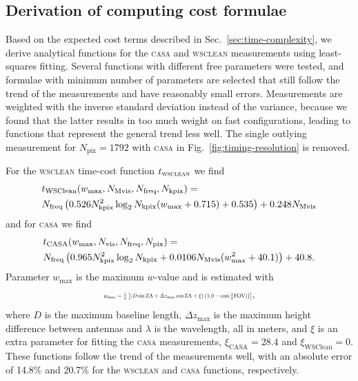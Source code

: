\documentclass[useAMS,usenatbib]{mn2e}
\begin{document}

\subsection{Derivation of computing cost formulae}
Based on the expected cost terms described in Sec.~\ref{sec:time-complexity}, we derive analytical functions for the \textsc{casa} and \textsc{wsclean} measurements using least-squares fitting. Several functions with different free parameters were tested, and formulae with minimum number of parameters are selected that still follow the trend of the measurements and have reasonably small errors. Measurements are weighted with the inverse standard deviation instead of the variance, because we found that the latter results in too much weight on fast configurations, leading to functions that represent the general trend less well. The single outlying measurement for $N_\textrm{pix}=1792$ with \textsc{casa} in Fig.~\ref{fig:timing-resolution} is removed.

For the \textsc{wsclean} time-cost function $t_\textrm{\textsc{wsclean}}$ we find 
\begin{align}\label{eq:wsclean-computing-cost}
& t_\textrm{WSClean} (w_{\max},N_\textrm{Mvis},N_\textrm{freq},N_\textrm{kpix}) = \\ \notag%
& N_\textrm{freq} \left( 0.526 N_\textrm{kpix}^2 \log_2 N_\textrm{kpix} (w_{\max} + 0.715) + 0.535 \right) + 0.248 N_\textrm{Mvis}
\end{align}
and for \textsc{casa} we find
\begin{align}\label{eq:casa-computing-cost}
& t_\textrm{CASA}(w_{\max},N_\textrm{vis},N_\textrm{freq},N_\textrm{pix}) = \\ \notag%
& N_\textrm{freq} \left(0.965 N_\textrm{kpix}^2 \log_2 N_\textrm{kpix} + 0.0106 N_\textrm{Mvis} (w_{\max}^2 + 40.1)\right) + 40.8.
\label{eq:casa-computing-cost}%
\end{align}
Parameter $w_{\max}$ is the maximum $w$-value and is estimated with
\begin{equation}\resizebox{0.45\textwidth}{!}{$
 w_{\max} = \frac{1}{\lambda}\left[(D \sin \textrm{ZA} + \Delta z_{\max} \cos \textrm{ZA} + \xi) \left(1.0 - \cos(\frac{1}{2}\textrm{FOV})\right)\right]$},
\end{equation}%
where $D$ is the maximum baseline length, $\Delta z_{\max}$ is the maximum height difference between antennas and $\lambda$ is the wavelength, all in meters, and $\xi$ is an extra parameter for fitting the \textsc{casa} measurements, $\xi_\textrm{CASA}=28.4$ and $\xi_\textrm{WSClean}=0$. These functions follow the trend of the measurements well, with an absolute error of 14.8\% and 20.7\% for the \textsc{wsclean} and \textsc{casa} functions, respectively.
\end{document}
